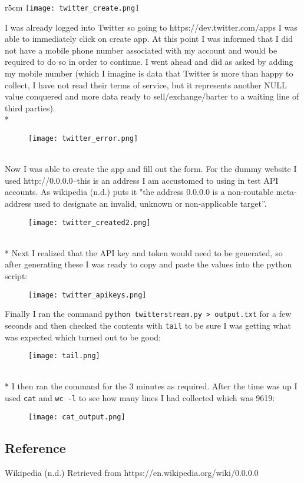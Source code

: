 \documentclass[10pt]{article}
\begin{document}
\begin{wrapfigure}{r}{5cm}
\texttt{[image: twitter\_create.png]}
\end{wrapfigure}
I was already logged into Twitter so going to https://dev.twitter.com/apps I was able to immediately click on create app. At this point I was informed that I did not have a mobile phone number associated with my account and would be required to do so in order to continue. I went ahead and did as asked by adding my mobile number (which I imagine is data that Twitter is more than happy to collect, I have not read their terms of service, but it represents another NULL value conquered and more data ready to sell/exchange/barter to a waiting line of third parties). \\*
\begin{figure}[!h]
\texttt{[image: twitter\_error.png]}
\centering
\end{figure}\\
Now I was able to create the app and fill out the form. For the dummy website I used http://0.0.0.0--this is an address I am accustomed to using in test API accounts. As wikipedia (n.d.) puts it "the address 0.0.0.0 is a non-routable meta-address used to designate an invalid, unknown or non-applicable target”.  
\begin{figure}[!h]
\texttt{[image: twitter\_created2.png]}
\centering
\end{figure}\\*
Next I realized that the API key and token would need to be generated, so after generating these I was ready to copy and paste the values into the python script:
\begin{figure}[!h]
\texttt{[image: twitter\_apikeys.png]}
\centering
\end{figure}

Finally I ran the command \verb|python twitterstream.py > output.txt| for a few seconds and then checked the contents with \verb|tail| to be sure I was getting what was expected which turned out to be good:
\begin{figure}[!h]
\texttt{[image: tail.png]}
\centering
\end{figure}\\*
\noindent 
I then ran the command for the 3 minutes as required. After the time was up I used \verb|cat| and \verb|wc -l| to see how many lines I had collected which was 9619:
\begin{figure}[!h]
\texttt{[image: cat\_output.png]}
\end{figure}
\subsection*{Reference}
Wikipedia (n.d.) Retrieved from https://en.wikipedia.org/wiki/0.0.0.0
\end{document}
